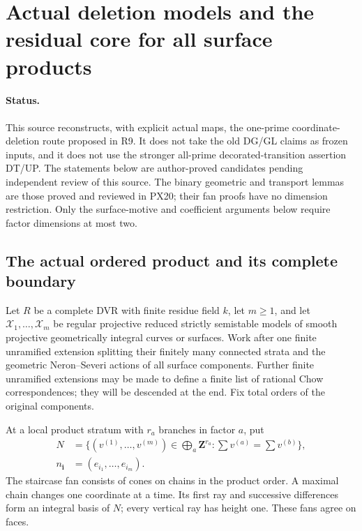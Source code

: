 \section{Actual deletion models and the residual core for all surface products}
\label{r20dp:section}

\paragraph{Status.}
This source reconstructs, with explicit actual maps, the one-prime
coordinate-deletion route proposed in R9. It does not take the old
DG/GL claims as frozen inputs, and it does not use the stronger
all-prime decorated-transition assertion DT/UP. The statements below
are author-proved candidates pending independent review of this
source. The binary geometric and transport lemmas are those proved
and reviewed in PX20; their fan proofs have no dimension restriction.
Only the surface-motive and coefficient arguments below require
factor dimensions at most two.

\subsection{The actual ordered product and its complete boundary}

Let $R$ be a complete DVR with finite residue field $k$, let $m\geq1$,
and let
$\mathcal X_1,\ldots,\mathcal X_m$ be regular projective reduced
strictly semistable models of smooth projective geometrically
integral curves or surfaces. Work after one finite unramified
extension splitting their finitely many connected strata and the
geometric Neron--Severi actions of all surface components. Further
finite unramified extensions may be made to define a finite list
of rational Chow correspondences; they will be descended at the
end. Fix total orders of the original components.

At a local product stratum with $r_a$ branches in factor $a$, put
\[
 \begin{split}
 N&=\{(v^{(1)},\ldots,v^{(m)})\in\textstyle\bigoplus_a
          \mathbf Z^{r_a}:\sum v^{(a)}=\sum v^{(b)}\},\\
 n_{\mathbf i}&=(e_{i_1},\ldots,e_{i_m}).
 \end{split}
 \tag{DP20.1}
\]
The staircase fan consists of cones on chains in the product order.
A maximal chain changes one coordinate at a time. Its first ray
and successive differences form an integral basis of $N$; every
vertical ray has height one. These fans agree on faces.

